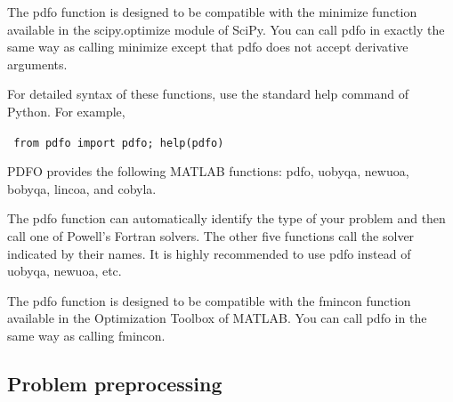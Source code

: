 \documentclass[
    smallextended,  %
    final,        %
]{svjour3}
\begin{document}
The pdfo function is designed to be compatible with the minimize function available in the scipy.optimize module of SciPy. You can call pdfo in exactly the same way as calling minimize except that pdfo does not accept derivative arguments.

For detailed syntax of these functions, use the standard help command of Python. For example,

\texttt{
 from pdfo import pdfo; help(pdfo)
 }

 PDFO provides the following MATLAB functions: pdfo, uobyqa, newuoa, bobyqa, lincoa, and cobyla.

The pdfo function can automatically identify the type of your problem and then call one of Powell's Fortran solvers. The other five functions call the solver indicated by their names. It is highly recommended to use pdfo instead of uobyqa, newuoa, etc.

The pdfo function is designed to be compatible with the fmincon function available in the Optimization Toolbox of MATLAB. You can call pdfo in the same way as calling fmincon.







\subsection{Problem preprocessing}
\label{subsec:pdfo-preprocessing}
\end{document}
